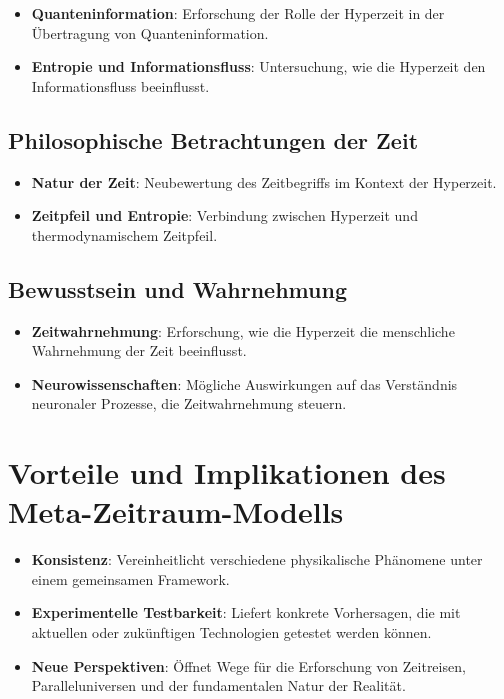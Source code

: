 \documentclass[11pt,a4paper]{article}
\begin{document}
\begin{itemize}
    \item \textbf{Quanteninformation}: Erforschung der Rolle der Hyperzeit in der Übertragung von Quanteninformation.
    \item \textbf{Entropie und Informationsfluss}: Untersuchung, wie die Hyperzeit den Informationsfluss beeinflusst.
\end{itemize}

\subsection{Philosophische Betrachtungen der Zeit}

\begin{itemize}
    \item \textbf{Natur der Zeit}: Neubewertung des Zeitbegriffs im Kontext der Hyperzeit.
    \item \textbf{Zeitpfeil und Entropie}: Verbindung zwischen Hyperzeit und thermodynamischem Zeitpfeil.
\end{itemize}

\subsection{Bewusstsein und Wahrnehmung}

\begin{itemize}
    \item \textbf{Zeitwahrnehmung}: Erforschung, wie die Hyperzeit die menschliche Wahrnehmung der Zeit beeinflusst.
    \item \textbf{Neurowissenschaften}: Mögliche Auswirkungen auf das Verständnis neuronaler Prozesse, die Zeitwahrnehmung steuern.
\end{itemize}

\section{Vorteile und Implikationen des Meta-Zeitraum-Modells}

\begin{itemize}
    \item \textbf{Konsistenz}: Vereinheitlicht verschiedene physikalische Phänomene unter einem gemeinsamen Framework.
    \item \textbf{Experimentelle Testbarkeit}: Liefert konkrete Vorhersagen, die mit aktuellen oder zukünftigen Technologien getestet werden können.
    \item \textbf{Neue Perspektiven}: Öffnet Wege für die Erforschung von Zeitreisen, Paralleluniversen und der fundamentalen Natur der Realität.
\end{itemize}
\end{document}
